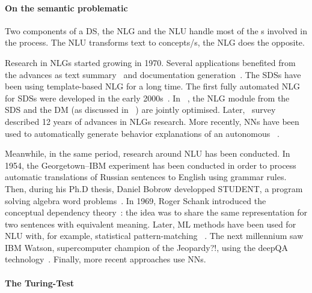 \paragraph{On the semantic problematic}

Two components of a \gls{DS}, the \gls{NLG} and the \gls{NLU} handle most of the s involved in the  process. The \gls{NLU} transforms text to concepts/s, the \gls{NLG} does the opposite.

Research in \glspl{NLG} started growing in 1970. Several applications benefited from the advances as text summary~\parencite{nlg-weather-forecast} and documentation generation~\parencite{poo-nlg}. The \glspl{SDS} have been using template-based \gls{NLG} for a long time. The first fully automated \gls{NLG} for \glspl{SDS} were developed in the early 2000s~\parencite{oh2000stochastic,rambow}. In ~\textcite{lemon2011learning}, the \gls{NLG} module from the \gls{SDS} and the \gls{DM} (as discussed in ~) are jointly optimised. Later,~\textcite{survey-nlg} survey described 12 years of advances in \glspl{NLG} research. More recently, \glspl{NN} have been used to automatically generate behavior explanations of an autonomous ~\parencite{Ehsan:2018:RNM:3278721.3278736}.

Meanwhile, in the same period, research around \gls{NLU} has been conducted. In 1954, the Georgetown–IBM experiment has been conducted in order to process automatic translations of Russian sentences to English using grammar rules. Then, during his Ph.D thesis, Daniel Bobrow developped STUDENT, a program solving algebra word problems~\parencite{nlu-bobrow}. In 1969, Roger Schank introduced the conceptual dependency theory~\parencite{nlu-concept}: the idea was to share the same representation for two sentences with equivalent meaning. Later, \gls{ML} methods have been used for \gls{NLU} with, for example, statistical pattern-matching ~\parencite{Allen:1995:NLU:199291}. The next millennium saw IBM Watson, supercomputer champion of the Jeopardy?!, using the deepQA technology~\parencite{Ferrucci2010}. Finally, more recent approaches use \glspl{NN}.


\paragraph{The Turing-Test}

